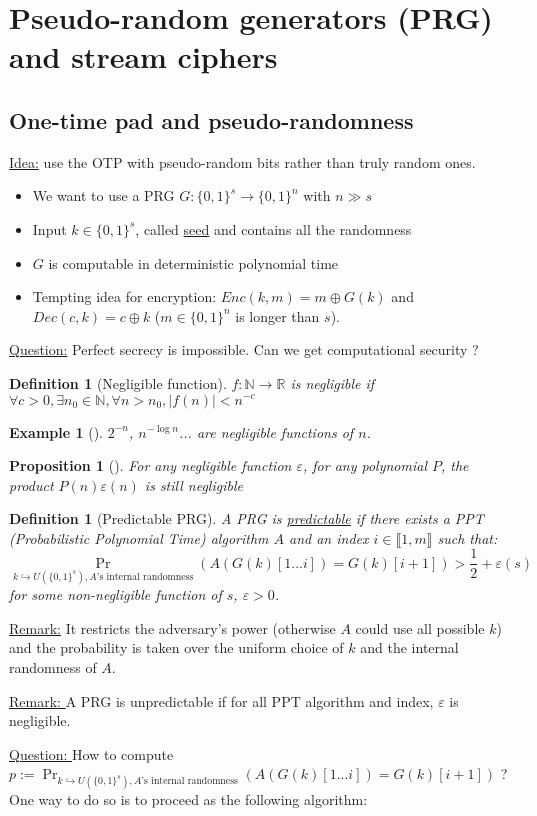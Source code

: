 \documentclass{article}
\newtheorem{prop}[thm]{Proposition}
\newtheorem{defi}[thm]{Definition}
\newtheorem{ex}[thm]{Example}
\newcommand{\Ex}[3]{\begin{ex}[#1]\label{#2}#3\end{ex}}
\newcommand{\Def}[3]{\begin{defi}[#1]\label{#2}#3\end{defi}}
\newcommand{\Prop}[3]{\begin{prop}[#1]\label{#2}#3\end{prop}}
\newcommand{\R}{\mathbb{R}}
\newcommand{\N}{\mathbb{N}}
\renewcommand{\epsilon}{\varepsilon}
\begin{document}
\section{Pseudo-random generators (PRG) and stream ciphers}
\subsection{One-time pad and pseudo-randomness}
\underline{Idea:} use the OTP with pseudo-random bits rather than truly random ones.

\begin{itemize}
\item We want to use a PRG $G:\{0,1\}^s\rightarrow\{0,1\}^n$ with $n\gg s$
\item Input $k\in\{0,1\}^s$, called \underline{seed} and contains all the randomness
\item $G$ is computable in deterministic polynomial time
\item Tempting idea for encryption: $Enc(k,m) = m\oplus G(k)$ and $Dec(c,k) = c\oplus k$ ($m\in\{0,1\}^n$ is longer than $s$).
\end{itemize}
\underline{Question:} Perfect secrecy is impossible. Can we get computational security ?

\Def{Negligible function}{def:negligFunc}{$f:\N\rightarrow\R$ is negligible if $\forall c>0,\exists n_0\in\N, \forall n>n_0,|f(n)|<n^{-c}$}

\Ex{}{}{$2^{-n}$, $n^{-\log n}$... are negligible functions of $n$.}

\Prop{}{}{For any negligible function $\epsilon$, for any polynomial $P$, the product $P(n)\epsilon(n)$ is still negligible}

\Def{Predictable PRG}{def:predPRG}{
A PRG is \underline{predictable} if there exists a PPT (Probabilistic Polynomial Time) algorithm $A$ and an index $i\in\llbracket1,m\rrbracket$ such that:
\[\Pr_{k\hookrightarrow U(\{0,1\}^s), \text{$A$'s internal randomness}}(A(G(k)[1...i])=G(k)[i+1])>\frac{1}{2}+\epsilon(s)\]
for some non-negligible function of $s$, $\epsilon>0$.}
\underline{Remark:} It restricts the adversary's power (otherwise $A$ could use all possible $k$) and the probability is taken over the uniform choice of $k$ and the internal randomness of $A$.

\underline{Remark: } A PRG is unpredictable if for all PPT algorithm and index, $\epsilon$ is negligible.

\underline{Question: } How to compute $p:=\Pr_{k\hookrightarrow U(\{0,1\}^s), \text{$A$'s internal randomness}}(A(G(k)[1...i])=G(k)[i+1])$ ? One way to do so is to proceed as the following algorithm:\\
\end{document}
